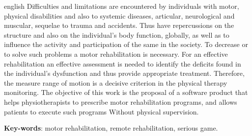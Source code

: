 \begin{resumo}[Abstract]
 \begin{otherlanguage*}{english}
Difficulties and limitations are encountered by individuals with motor, physical
disabilities and also to systemic diseases, articular, neurological and muscular,
 sequelae to trauma and accidents. Thus have repercussions on the structure and
 also on the individual's body function, globally, as well as to influence the
activity and  participation of the same in the society. To decrease or to solve such problems
 a motor rehabilitation is necessary. For an effective rehabilitation an effective
 assessment is needed to identify the deficits found in the individual's dysfunction
 and thus provide appropriate treatment. Therefore, the measure range of motion
 is a decisive criterion in the physical therapy monitoring.  The objective of this work is the proposal of a software
  product that helps physiotherapists to prescribe motor rehabilitation programs, and allows patients to execute such programs
Without physical supervision.
   \vspace{\onelineskip}

   \noindent
   \textbf{Key-words}: motor rehabilitation, remote rehabilitation, serious game.
 \end{otherlanguage*}
\end{resumo}
